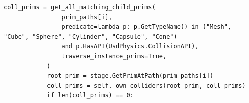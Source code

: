 \begin{snippetbox}[12]
\begin{lstlisting}[firstnumber=61]
            coll_prims = get_all_matching_child_prims(
                prim_paths[i],
                predicate=lambda p: p.GetTypeName() in ("Mesh", "Cube", "Sphere", "Cylinder", "Capsule", "Cone")
                and p.HasAPI(UsdPhysics.CollisionAPI),
                traverse_instance_prims=True,
            )
            root_prim = stage.GetPrimAtPath(prim_paths[i])
            coll_prims = self._own_colliders(root_prim, coll_prims)
            if len(coll_prims) == 0:
\end{lstlisting}
\end{snippetbox}
